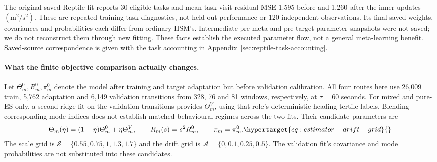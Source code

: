 The original saved Reptile fit reports 30 eligible tasks and mean
task-visit residual MSE 1.595 before and 1.260 after the inner updates
\((\mathrm{m}^2/\mathrm{s}^2)\). These are repeated training-task diagnostics,
not held-out performance or 120 independent observations. Its final saved
weights, covariances and probabilities each differ from ordinary HSM's.
Intermediate pre-meta and pre-target parameter snapshots were not saved;
we do not reconstruct them through new fitting. These facts establish the
executed parameter flow, not a general meta-learning benefit. Saved-source
correspondence is given with the task accounting in
Appendix~\ref{sec:reptile-task-accounting}.

\paragraph{What the finite objective comparison actually changes.}
\label{sec:estimator-calibration}\hypertarget{sec:estimator-calibration}{}
Let \(\Theta_m^0,R_m^0,\pi_m^0\) denote the model after training and target
adaptation but before validation calibration. All four routes here use
26,009 train, 5,762 adaptation and 6,149 validation transitions from
328, 76 and 81 windows, respectively, at \(\tau=60\) seconds.
For mixed and pure-ES only, a second ridge fit on the validation transitions
provides \(\Theta_m^V\), using that role's deterministic heading-tertile
labels. Blending corresponding mode indices does not establish matched
behavioural regimes across the two fits. Their candidate parameters are
\begin{equation}
\Theta_m(\eta)=(1-\eta)\Theta_m^0+\eta\Theta_m^V,\qquad
R_m(s)=s^2R_m^0,\qquad \pi_m=\pi_m^0 .
\label{eq:estimator-drift-grid}\hypertarget{eq:estimator-drift-grid}{}
\end{equation}
The scale grid is \(\mathcal S=\{0.55,0.75,1,1.3,1.7\}\) and the drift
grid is \(\mathcal A=\{0,0.1,0.25,0.5\}\). The validation fit's covariance
and mode probabilities are not substituted into these candidates.

